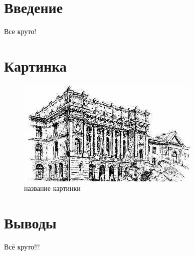 





\newpage


\section*{Введение}
\large Все круто!
\section*{Картинка}

\begin{figure}[H]
	\begin{center}
		\includegraphics[scale=0.7]{pics/spbpu}
		\caption{название картинки} 
		\label{pic:pic_name} %
	\end{center}
\end{figure}

\section*{Выводы}
Всё круто!!!


